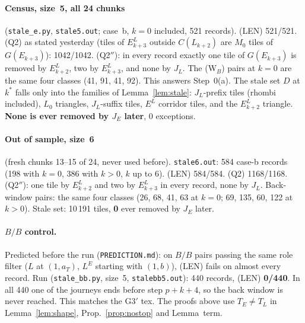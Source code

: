 \documentclass[11pt]{article}
\theoremstyle{remark}\newtheorem{remark}[theorem]{Remark}
\begin{document}
\paragraph{Census, size~5, all 24 chunks} (\texttt{stale\_e.py}, \texttt{stale5.out}; case~b, $k=0$ included, 521 records). (LEN) 521/521. (Q2) as stated yesterday (tiles of $E^L_{k+3}$ outside $C(L_{k+2})$ are $M_0$ tiles of $G(E_{k+3})$): 1042/1042. (Q2$''$): in every record exactly one tile of $G(E_{k+3})$ is removed by $E^L_{k+2}$, two by $E^L_{k+3}$, and none by $J_L$. The (W$_B$) pairs at $k=0$ are the same four classes (41, 91, 41, 92). This answers Step~0(a). The stale set $D$ at $k^*$ falls only into the families of Lemma~\ref{lem:stale}: $J_L$-prefix tiles (rhombi included), $L_0$ triangles, $J_L$-suffix tiles, $E^L$ corridor tiles, and the $E^L_{k+2}$ triangle. \textbf{None is ever removed by $J_E$ later}, 0 exceptions.
\paragraph{Out of sample, size~6} (fresh chunks 13--15 of 24, never used before). \texttt{stale6.out}: 584 case-b records (198 with $k=0$, 386 with $k>0$, $k$ up to $6$). (LEN) 584/584. (Q2) 1168/1168. (Q2$''$): one tile by $E^L_{k+2}$ and two by $E^L_{k+3}$ in every record, none by $J_L$. Back-window pairs: the same four classes (26, 68, 41, 63 at $k=0$; 69, 135, 60, 122 at $k>0$). Stale set: 10\,191 tiles, \textbf{0} ever removed by $J_E$ later.
\paragraph{$B/B$ control.} Predicted before the run (\texttt{PREDICTION.md}): on $B/B$ pairs passing the same role filter ($L$ at $(1,a_T)$, $L^E$ starting with $(1,b)$), (LEN) fails on almost every record. Run (\texttt{stale\_bb.py}, size~5, \texttt{stalebb5.out}): 440 records, (LEN) \textbf{0/440}. In all 440 one of the journeys ends before step $p+k+4$, so the back window is never reached. This matches the G3$'$ tex. The proofs above use $T_E\ne T_L$ in Lemma~\ref{lem:shape}, Prop.~\ref{prop:nostop} and Lemma~term.
\end{document}
